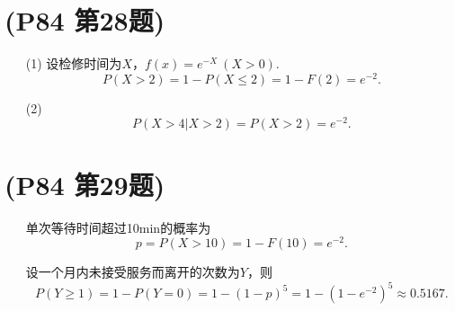 \documentclass{article}
\begin{document}
\section{(P84 第28题)}  %
\begin{enumerate}
    \item [(1)]设检修时间为$X$，$f(x)=e^{-X}\ (X>0)$.
    \[
        P(X> 2)
        =1-P(X\leq 2)
        =1- F(2)  
        =e^{-2}.
    \]
    \item [(2)]
    \[
        P(X>4|X>2)=P(X>2)=e^{-2}.
    \]
\end{enumerate}

\section{(P84 第29题)}  %
\begin{enumerate}
    \item []单次等待时间超过10min的概率为
    \[
        p = P(X> 10) = 1-F(10) = e^{-2}.
    \]
    \item []设一个月内未接受服务而离开的次数为$Y$，则
    \[
        P(Y\geq 1) = 1- P(Y=0) = 1 - {(1-p)}^{5}
        =1 - {(1-e^{-2})}^{5}
        \approx 0.5167. 
    \]
\end{enumerate}
\end{document}
